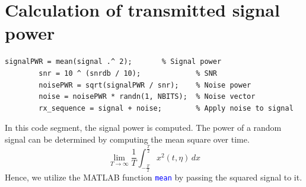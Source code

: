 \documentclass[a4paper, 12pt, english]{article}
\newcommand{\highlight}[1]{\textcolor{blue}{\texttt{#1}}}
\begin{document}


\section{Calculation of transmitted signal power}
\begin{lstlisting}[style=matlab]
        signalPWR = mean(signal .^ 2);       % Signal power
        snr = 10 ^ (snrdb / 10);             % SNR
        noisePWR = sqrt(signalPWR / snr);    % Noise power
        noise = noisePWR * randn(1, NBITS);  % Noise vector
        rx_sequence = signal + noise;        % Apply noise to signal
\end{lstlisting}
In this code segment, the signal power is computed. The power of a random signal can be determined by computing the mean square over time. \[ \lim_{T\to\infty} \frac{1}{T}\int_{-\frac{T}{2}}^{\frac{T}{2}}{x^2(t,\eta)} \,dx \]
 Hence, we utilize the MATLAB function \highlight{mean} by passing the squared signal to it.


\null\newpage
\end{document}
